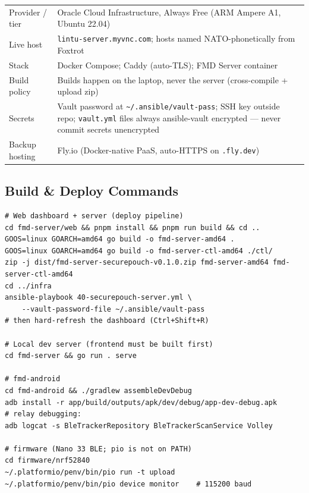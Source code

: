 \documentclass[11pt,a4paper]{article}
\begin{document}
\begin{table}[h]
\small
\begin{tabularx}{\textwidth}{lL}
\toprule
Provider / tier & Oracle Cloud Infrastructure, Always Free (ARM Ampere A1, Ubuntu 22.04)\\
Live host & \texttt{lintu-server.myvnc.com}; hosts named NATO-phonetically from Foxtrot\\
Stack & Docker Compose; Caddy (auto-TLS); FMD Server container\\
Build policy & Builds happen on the laptop, never the server (cross-compile + upload zip)\\
Secrets & Vault password at \texttt{\textasciitilde/.ansible/vault-pass}; SSH key outside repo; \texttt{vault.yml} files always ansible-vault encrypted --- never commit secrets unencrypted\\
Backup hosting & Fly.io (Docker-native PaaS, auto-HTTPS on \texttt{.fly.dev})\\
\bottomrule
\end{tabularx}
\end{table}

\subsection{Build \& Deploy Commands}

\begin{Verbatim}[frame=single,fontsize=\small]
# Web dashboard + server (deploy pipeline)
cd fmd-server/web && pnpm install && pnpm run build && cd ..
GOOS=linux GOARCH=amd64 go build -o fmd-server-amd64 .
GOOS=linux GOARCH=amd64 go build -o fmd-server-ctl-amd64 ./ctl/
zip -j dist/fmd-server-securepouch-v0.1.0.zip fmd-server-amd64 fmd-server-ctl-amd64
cd ../infra
ansible-playbook 40-securepouch-server.yml \
    --vault-password-file ~/.ansible/vault-pass
# then hard-refresh the dashboard (Ctrl+Shift+R)

# Local dev server (frontend must be built first)
cd fmd-server && go run . serve

# fmd-android
cd fmd-android && ./gradlew assembleDevDebug
adb install -r app/build/outputs/apk/dev/debug/app-dev-debug.apk
# relay debugging:
adb logcat -s BleTrackerRepository BleTrackerScanService Volley

# firmware (Nano 33 BLE; pio is not on PATH)
cd firmware/nrf52840
~/.platformio/penv/bin/pio run -t upload
~/.platformio/penv/bin/pio device monitor    # 115200 baud
\end{Verbatim}
\end{document}
